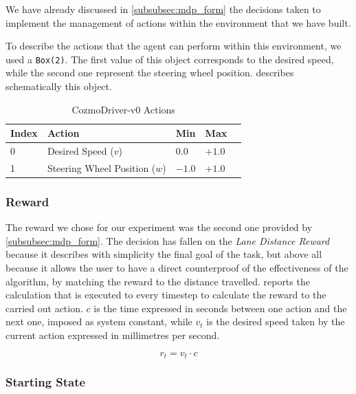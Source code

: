 We have already discussed in \vref{subsubsec:mdp_form} the decisions taken to implement the management of actions within the environment that we have built.

To describe the actions that the agent can perform within this environment, we used a \texttt{Box(2)}. The first value of this object corresponds to the desired speed, while the second one represent the steering wheel position.  describes schematically this object.

\begin{table}[!h]
	\centering
	\caption{CozmoDriver-v0 Actions}
	\label{table:cozmo_actions}
	\begin{tabular}{@{}lllll@{}}
		\toprule
		Index & Action                        & Min    & Max    \\ \midrule
		0     & Desired Speed ($v$)           & $0.0$  & $+1.0$ \\
		1     & Steering Wheel Position ($w$) & $-1.0$ & $+1.0$ \\

		\bottomrule
	\end{tabular}
\end{table}

\subsubsection{Reward}

The reward we chose for our experiment was the second one provided by \vref{subsubsec:mdp_form}.
The decision has fallen on the \textit{Lane Distance Reward} because it describes with simplicity the final goal of the task, but above all because it allows the user to have a direct counterproof of the effectiveness of the algorithm, by matching the reward to the distance travelled.
 reports the calculation that is executed to every timestep to calculate the reward to the carried out action.
$c$ is the time expressed in seconds between one action and the next one, imposed as system constant, while $v_t$ is the desired speed taken by the current action expressed in millimetres per second.

\begin{equation}
	\label{eq:reward_fun}
	r_t = v_t \cdot c
\end{equation}

\subsubsection{Starting State}

